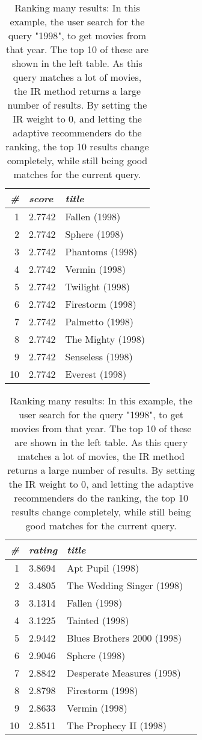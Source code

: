 \begin{table}[t]
  \centering 
  \begin{minipage}{0.49\textwidth}
    \centering 

  \begin{tabular*}{\textwidth}{ r l l }
    \toprule
    \emph{\#} & \emph{score} & \emph{title}\\
    \midrule
    1 &  2.7742  &  Fallen (1998)      \\
    2 &  2.7742  &  Sphere (1998)      \\
    3 &  2.7742  &  Phantoms (1998)    \\
    4 &  2.7742  &  Vermin (1998)      \\
    5 &  2.7742  &  Twilight (1998)    \\
    6 &  2.7742  &  Firestorm (1998)   \\
    7 &  2.7742  &  Palmetto (1998)    \\
    8 &  2.7742  &  The Mighty (1998)  \\
    9 &  2.7742  &  Senseless (1998)   \\
    10&  2.7742  &  Everest (1998)     \\
    \bottomrule
  \end{tabular*}
\end{minipage} 
\hfill 
\begin{minipage}{0.49\textwidth}
  \begin{tabular*}{\textwidth}{ r l l l }
    \toprule
    \emph{\#} & \emph{rating} & \emph{title}\\
    \midrule
    1 &  3.8694  &  Apt Pupil (1998)            \\
    2 &  3.4805  &  The Wedding Singer (1998)   \\
    3 &  3.1314  &  Fallen (1998)               \\
    4 &  3.1225  &  Tainted (1998)              \\
    5 &  2.9442  &  Blues Brothers 2000 (1998)  \\
    6 &  2.9046  &  Sphere (1998)               \\
    7 &  2.8842  &  Desperate Measures (1998)   \\
    8 &  2.8798  &  Firestorm (1998)            \\
    9 &  2.8633  &  Vermin (1998)               \\
    10&  2.8511  &  The Prophecy II (1998)      \\
    \bottomrule
  \end{tabular*}
  \end{minipage} 
  \vspace{1em}
  \caption[Ranking Many Results]{
    Ranking many results: 
    In this example, the user search for the query "1998", to get movies from that year.
    The top 10 of these are shown in the left table. As this query matches a lot of 
    movies, the IR method returns a large number of results. By setting the IR weight to $0$,
    and letting the adaptive recommenders do the ranking, the top 10 results change completely,
    while still being good matches for the current query.
  }
  \label{table:rank:year}
\end{table}
